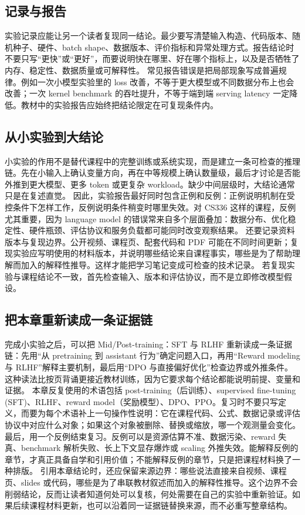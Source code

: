 \documentclass[a4paper]{article}
\begin{document}
\subsection{记录与报告}
实验记录应能让另一个读者复现同一结论。最少要写清楚输入构造、代码版本、随机种子、硬件、batch shape、数据版本、评价指标和异常处理方式。报告结论时不要只写“更快”或“更好”，而要说明快在哪里、好在哪个指标上，以及是否牺牲了内存、稳定性、数据质量或可解释性。
常见报告错误是把局部现象写成普遍规律。例如一次小模型实验里的 loss 改善，不等于更大模型或不同数据分布上也会改善；一次 kernel benchmark 的吞吐提升，不等于端到端 serving latency 一定降低。教材中的实验报告应始终把结论限定在可复现条件内。
\subsection{从小实验到大结论}
小实验的作用不是替代课程中的完整训练或系统实现，而是建立一条可检查的推理链。先在小输入上确认变量方向，再在中等规模上确认数量级，最后才讨论是否能外推到更大模型、更多 token 或更复杂 workload。缺少中间层级时，大结论通常只是在复述直觉。
因此，实验报告最好同时包含正例和反例：正例说明机制在受控条件下怎样工作，反例说明条件稍变时哪里失效。对 CS336 这样的课程，反例尤其重要，因为 language model 的错误常来自多个层面叠加：数据分布、优化稳定性、硬件瓶颈、评估协议和服务负载都可能同时改变观察结果。
还要记录资料版本与复现边界。公开视频、课程页、配套代码和 PDF 可能在不同时间更新；复现实验应写明使用的材料版本，并说明哪些结论来自课程事实，哪些是为了帮助理解而加入的解释性推导。这样才能把学习笔记变成可检查的技术记录。
若复现实验与课程结论不一致，首先检查输入、版本和评估协议，而不是立即修改模型假设。
\subsection{把本章重新读成一条证据链}
完成小实验之后，可以把 Mid/Post-training：SFT 与 RLHF 重新读成一条证据链：先用“从 pretraining 到 assistant 行为”确定问题入口，再用“Reward modeling 与 RLHF”解释主要机制，最后用“DPO 与直接偏好优化”检查边界或外推条件。这种读法比按页背诵更接近教材训练，因为它要求每个结论都能说明前提、变量和证据。
本章反复使用的术语包括 post-training（后训练）、supervised fine-tuning (SFT)、RLHF、reward model（奖励模型）、DPO、PPO。复习时不要只写定义，而要为每个术语补上一句操作性说明：它在课程代码、公式、数据记录或评估协议中对应什么对象；如果这个对象被删除、替换或缩放，哪一个观测量会变化。
最后，用一个反例结束复习。反例可以是资源估算不准、数据污染、reward 失真、benchmark 解析失败、长上下文显存爆炸或 scaling 外推失效。能解释反例的章节，才真正具备自学和引用价值；不能解释反例的章节，只是把课程材料换了一种排版。
引用本章结论时，还应保留来源边界：哪些说法直接来自视频、课程页、slides 或代码，哪些是为了串联教材叙述而加入的解释性推导。这个边界不会削弱结论，反而让读者知道何处可以复核，何处需要在自己的实验中重新验证。如果后续课程材料更新，也可以沿着同一证据链替换来源，而不必重写整章结构。
\end{document}
